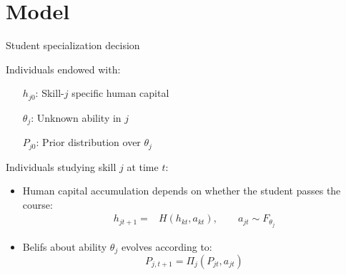 \documentclass[compress, 8pt]{beamer}
\newcommand{\sbr}[1]{\left[ #1 \right]}
\newcommand{\pr}[1]{\left( #1 \right)}
\begin{document}
\section[Model]{Model}


\begin{frame}{Student specialization decision}


Individuals endowed with: %
\begin{itemize}
	\item [$h_{j0}$:] Skill-$j$ specific human capital
	\item [$\theta_j$:] Unknown ability in $j$
	\item [$P_{j0}$:] Prior distribution over $\theta_j$
\end{itemize}

\vspace{2ex}
Individuals studying skill $j$ at time $t$:
\begin{itemize} 
	\item Human capital accumulation depends on whether the student passes the course:
	\begin{align*}
	h_{jt+1} =& H(h_{kt}, a_{kt}), \quad \quad
	a_{jt} \sim F_{\theta_j}
	\end{align*}
	\item Belifs about ability $\theta_j$ evolves according to:
	\begin{equation*}
		P_{j,t+1} = \Pi_j (P_{jt},a_{jt})
	\end{equation*}
\end{itemize}


\end{frame}
\end{document}

